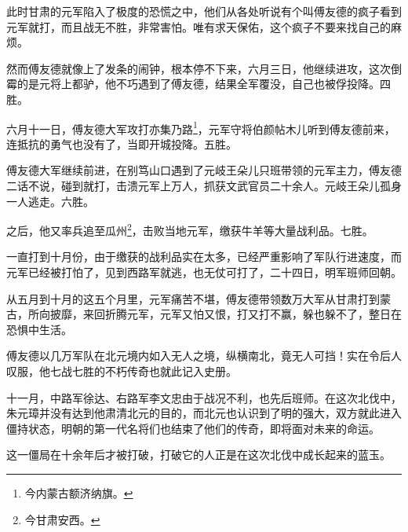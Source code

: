 \begin{multicols}{\theparacolNo}
		此时甘肃的元军陷入了极度的恐慌之中，他们从各处听说有个叫傅友德的疯子看到元军就打，而且战无不胜，非常害怕。唯有求天保佑，这个疯子不要来找自己的麻烦。

		然而傅友德就像上了发条的闹钟，根本停不下来，六月三日，他继续进攻，这次倒霉的是元将上都驴，他不巧遇到了傅友德，结果全军覆没，自己也被俘投降。四胜。

		六月十一日，傅友德大军攻打亦集乃路\footnote{今内蒙古额济纳旗。}，元军守将伯颜帖木儿听到傅友德前来，连抵抗的勇气也没有了，当即开城投降。五胜。

		傅友德大军继续前进，在别笃山口遇到了元岐王朵儿只班带领的元军主力，傅友德二话不说，碰到就打，击溃元军上万人，抓获文武官员二十余人。元岐王朵儿孤身一人逃走。六胜。

		之后，他又率兵追至瓜州\footnote{今甘肃安西。}，击败当地元军，缴获牛羊等大量战利品。七胜。

		一直打到十月份，由于缴获的战利品实在太多，已经严重影响了军队行进速度，而元军已经被打怕了，见到西路军就逃，也无仗可打了，二十四日，明军班师回朝。

		从五月到十月的这五个月里，元军痛苦不堪，傅友德带领数万大军从甘肃打到蒙古，所向披靡，来回折腾元军，元军又怕又恨，打又打不赢，躲也躲不了，整日在恐惧中生活。

		傅友德以几万军队在北元境内如入无人之境，纵横南北，竟无人可挡！实在令后人叹服，他七战七胜的不朽传奇也就此记入史册。

		十一月，中路军徐达、右路军李文忠由于战况不利，也先后班师。在这次北伐中，朱元璋并没有达到他肃清北元的目的，而北元也认识到了明的强大，双方就此进入僵持状态，明朝的第一代名将们也结束了他们的传奇，即将面对未来的命运。

		这一僵局在十余年后才被打破，打破它的人正是在这次北伐中成长起来的蓝玉。
		\ifnum{}
	\end{multicols}
\fi
\newpage
